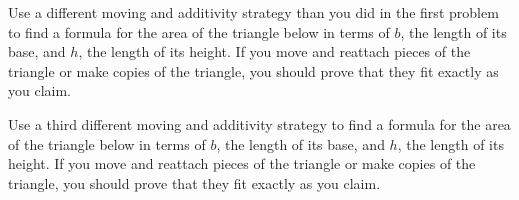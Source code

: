 \documentclass[nooutcomes,noauthor]{ximera}
\begin{document}
\begin{problem}
Use a different moving and additivity strategy than you did in the first problem to find a formula for the area of the triangle below in terms of $b$, the length of its base, and $h$, the length of its height. If you move and reattach pieces of the triangle or make copies of the triangle, you should prove that they fit exactly as you claim.

\begin{image}
\end{image}
\end{problem}

\begin{problem}
Use a third different moving and additivity strategy to find a formula for the area of the triangle below in terms of $b$, the length of its base, and $h$, the length of its height. If you move and reattach pieces of the triangle or make copies of the triangle, you should prove that they fit exactly as you claim.

\begin{image}
\end{image}
\end{problem}



\newpage
\end{document}
